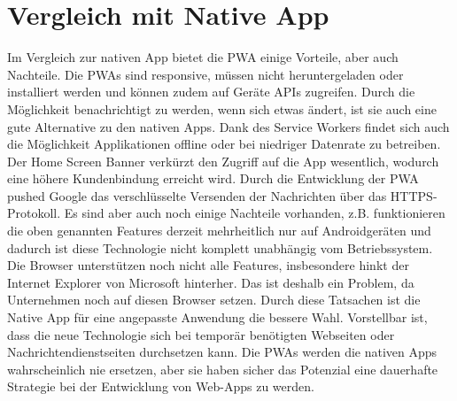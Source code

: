 \section{Vergleich mit Native App}
Im Vergleich zur nativen App bietet die \acl{PWA} einige Vorteile, aber auch Nachteile. Die \acs{PWA}s sind responsive, müssen nicht heruntergeladen oder\\ installiert werden und können zudem auf Geräte APIs zugreifen. Durch die Möglichkeit benachrichtigt zu werden, wenn sich etwas ändert, ist sie auch eine gute Alternative zu den nativen Apps.
Dank des Service Workers findet sich auch die Möglichkeit Applikationen offline oder bei niedriger Datenrate zu betreiben. 
Der Home Screen Banner verkürzt den Zugriff auf die App wesentlich, wodurch eine höhere Kundenbindung erreicht wird.  
Durch die Entwicklung der \acs{PWA} pushed Google das verschlüsselte Versenden der Nachrichten über das HTTPS-Protokoll.
Es sind aber auch noch einige Nachteile vorhanden, z.B. funktionieren die oben genannten Features derzeit mehrheitlich nur auf Androidgeräten und dadurch ist diese Technologie nicht komplett unabhängig vom Betriebssystem.
Die Browser unterstützen noch nicht alle Features, insbesondere hinkt der Internet Explorer von Microsoft hinterher. Das ist deshalb ein Problem, da Unternehmen noch auf diesen Browser setzen. 
Durch diese Tatsachen ist die Native App für eine angepasste Anwendung die bessere Wahl. 
Vorstellbar ist, dass die neue Technologie sich bei temporär benötigten Webseiten oder Nachrichtendienstseiten durchsetzen kann.
Die \acs{PWA}s werden die nativen Apps wahrscheinlich nie ersetzen, aber sie haben sicher das Potenzial eine dauerhafte Strategie bei der Entwicklung von \acs{Web-App}s zu werden.



